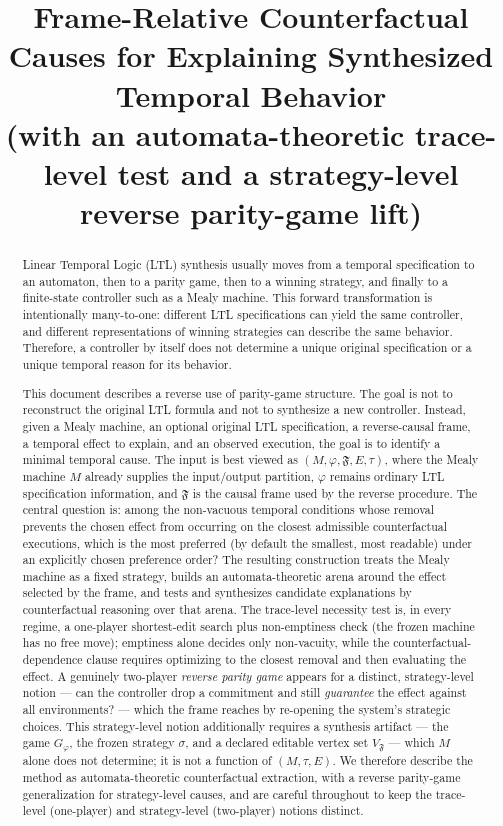 \documentclass[11pt]{article}
\title{Frame-Relative Counterfactual Causes for Explaining Synthesized
Temporal Behavior\\(with an automata-theoretic trace-level test and a
strategy-level reverse parity-game lift)}
\author{}
\date{}
\theoremstyle{remark}
\newcommand{\Frame}{\mathfrak{F}}
\begin{document}
\maketitle

\begin{abstract}
Linear Temporal Logic (LTL) synthesis usually moves from a temporal
specification to an automaton, then to a parity game, then to a winning
strategy, and finally to a finite-state controller such as a Mealy machine.
This forward transformation is intentionally many-to-one: different LTL
specifications can yield the same controller, and different representations of
winning strategies can describe the same behavior. Therefore, a controller by
itself does not determine a unique original specification or a unique temporal
reason for its behavior.

This document describes a reverse use of parity-game structure. The goal is not
to reconstruct the original LTL formula and not to synthesize a new controller.
Instead, given a Mealy machine, an optional original LTL specification, a
reverse-causal frame, a temporal effect to explain, and an observed execution,
the goal is to identify a minimal temporal cause.
The input is best viewed as
\((M,\varphi,\Frame,E,\tau)\), where the Mealy machine \(M\) already supplies the
input/output partition, \(\varphi\) remains ordinary LTL specification
information, and \(\Frame\) is the causal frame used by the reverse procedure.
The central question is: among the non-vacuous temporal conditions whose removal
prevents the chosen effect from occurring on the closest admissible
counterfactual executions, which is the most preferred (by default the smallest,
most readable) under an explicitly chosen preference order? The
resulting construction treats the Mealy machine as a fixed strategy, builds an
automata-theoretic arena around the effect selected by the frame, and tests and
synthesizes candidate explanations by counterfactual reasoning over that arena.
The trace-level necessity test is, in every regime, a one-player shortest-edit
search plus non-emptiness check (the frozen machine has no free move); emptiness
alone decides only non-vacuity, while the counterfactual-dependence clause
requires optimizing to the closest removal and then evaluating the effect. A genuinely two-player
\emph{reverse parity game} appears for a distinct, strategy-level notion --- can
the controller drop a commitment and still \emph{guarantee} the effect against all
environments? --- which the frame reaches by re-opening the system's strategic
choices. This strategy-level notion additionally requires a synthesis artifact ---
the game \(G_\varphi\), the frozen strategy \(\sigma\), and a declared editable
vertex set \(V_{\Frame}\) --- which \(M\) alone does not determine; it is not a
function of \((M,\tau,E)\). We therefore describe the method as automata-theoretic counterfactual
extraction, with a reverse parity-game generalization for strategy-level causes,
and are careful throughout to keep the trace-level (one-player) and strategy-level
(two-player) notions distinct.
\end{abstract}
\end{document}
